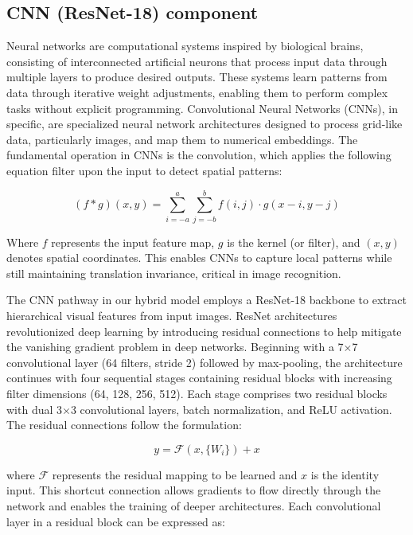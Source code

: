 \documentclass[11pt,a4paper,oneside]{report}
\begin{document}
\subsection{CNN (ResNet-18) component}
\noindent\hspace{1cm}
Neural networks are computational systems inspired by biological brains, consisting of interconnected artificial neurons that process input data through multiple layers to produce desired outputs. These systems learn patterns from data through iterative weight adjustments, enabling them to perform complex tasks without explicit programming. Convolutional Neural Networks (CNNs), in specific, are specialized neural network architectures designed to process grid-like data, particularly images, and map them to numerical embeddings. The fundamental operation in CNNs is the convolution, which applies the following equation filter upon the input to detect spatial patterns:

\begin{equation}
(f * g)(x,y) = \sum_{i=-a}^{a} \sum_{j=-b}^{b} f(i,j) \cdot g(x-i, y-j)
\end{equation}

Where $f$ represents the input feature map, $g$ is the kernel (or filter), and $(x,y)$ denotes spatial coordinates. This enables CNNs to capture local patterns while still maintaining translation invariance, critical in image recognition.

The CNN pathway in our hybrid model employs a ResNet-18 backbone \cite{he_deep_2015} to extract hierarchical visual features from input images. ResNet architectures revolutionized deep learning by introducing residual connections to help mitigate the vanishing gradient problem in deep networks. Beginning with a 7$\times$7 convolutional layer (64 filters, stride 2) followed by max-pooling, the architecture continues with four sequential stages containing residual blocks with increasing filter dimensions (64, 128, 256, 512). Each stage comprises two residual blocks with dual 3$\times$3 convolutional layers, batch normalization, and ReLU activation. The residual connections follow the formulation:

\begin{equation}
y = \mathcal{F}(x, \{W_i\}) + x
\end{equation}

where $\mathcal{F}$ represents the residual mapping to be learned and $x$ is the identity input. This shortcut connection allows gradients to flow directly through the network and enables the training of deeper architectures. Each convolutional layer in a residual block can be expressed as:
\end{document}
